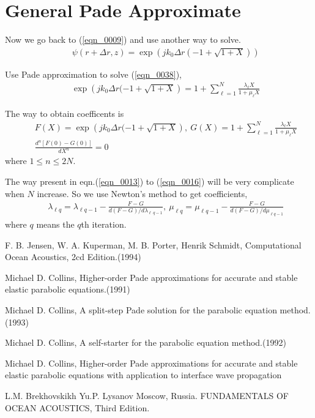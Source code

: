 \documentclass[journal,onecolumn]{IEEEtran}
\begin{document}
\section{General Pade Approximate}
Now we go back to (\ref{eqn_0009}) and use another way to solve.
\begin{eqnarray}
&&\psi(r + \Delta r, z) = \exp \left( j k_0 \Delta r (-1 + \sqrt{1 + X}) \right)
\label{eqn_0038}
\end{eqnarray}

Use Pade approximation to solve (\ref{eqn_0038}),
\begin{eqnarray}
&&\exp \left( j k_0 \Delta r (-1 + \sqrt{1 + X} \right) = 1 + \sum^N_{\ell = 1} \frac{\lambda_\ell X}{1 + \mu_\ell X}
\label{eqn_0039}
\end{eqnarray}

The way to obtain coefficents is
\begin{eqnarray}
&&F(X) = \exp \left( j k_0 \Delta r (-1 + \sqrt{1 + X} \right), \ G(X) = 1 + \sum^N_{\ell = 1} \frac{\lambda_\ell X}{1 + \mu_\ell X}
\label{eqn_0040}\\
&&\frac{d^n [F(0) - G(0)]}{d X^n} = 0
\label{eqn_0041}
\end{eqnarray}
where $1 \leq n \leq 2 N$. 

The way present in eqn.(\ref{eqn_0013}) to (\ref{eqn_0016}) will be very complicate when $N$ increase. So we use Newton's method to get coefficients,
\begin{eqnarray}
&&\lambda_{\ell q} = \lambda_{\ell q - 1} - \frac{F - G}{d(F - G)/ d \lambda_{\ell \ q - 1}} 
,\ \mu_{\ell q} = \mu_{\ell q - 1} - \frac{F - G}{d(F - G)/ d \mu_{\ell q - 1}} 
\label{eqn_0042}
\end{eqnarray}
where $q$ means the $q$th iteration.



\begin{thebibliography}{99}
F. B. Jensen, W. A. Kuperman, M. B. Porter, Henrik Schmidt,
Computational Ocean Acoustics, 2cd Edition.(1994)

Michael D. Collins,
Higher-order Pade approximations for accurate and stable elastic parabolic equations.(1991)

Michael D. Collins,
A split-step Pade solution for the parabolic equation method.(1993)

Michael D. Collins,
A self-starter for the parabolic equation method.(1992)

Michael D. Collins,
Higher-order Pade approximations for accurate and stable elastic parabolic equations
with application to interface wave propagation

L.M. Brekhovskikh Yu.P. Lysanov Moscow, Russia.
FUNDAMENTALS OF OCEAN ACOUSTICS, Third Edition.
\end{thebibliography}
\end{document}
